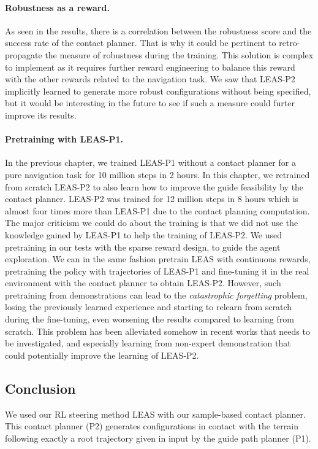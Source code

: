 \paragraph{Robustness as a reward.} 
As seen in the results, there is a correlation between the robustness score and the success rate of the contact planner. 
That is why it could be pertinent to retro-propagate the measure of robustness during the training.
This solution is complex to implement as it requires further reward engineering to balance this reward with the other rewards related to the navigation task. 
We saw that LEAS-P2 implicitly learned to generate more robust configurations without being specified, but it would be interesting in the future to see if such a measure could furter improve its results.

\paragraph{Pretraining with LEAS-P1.} 
In the previous chapter, we trained LEAS-P1 without a contact planner for a pure navigation task for 10 million steps in 2 hours. 
In this chapter, we retrained from scratch LEAS-P2 to also learn how to improve the guide feasibility by the contact planner. LEAS-P2 was trained for 12 million steps in 8 hours which is almost four times more than LEAS-P1 due to the contact planning computation. 
The major criticism we could do about the training is that we did not use the knowledge gained by LEAS-P1 to help the training of LEAS-P2.
We used pretraining in our tests with the sparse reward design, to guide the agent exploration.
We can in the same fashion pretrain LEAS with continuous rewards, pretraining the policy with trajectories of LEAS-P1 and fine-tuning it in the real environment with the contact planner to obtain LEAS-P2.
However, such pretraining from demonstrations can lead to the \textit{catastrophic forgetting} problem, losing the previously learned experience and starting to relearn from scratch during the fine-tuning, even worsening the results compared to learning from scratch.
This problem has been alleviated somehow in recent works \cite{DDPGfd,pretraining_BC} that needs to be investigated, and especially learning from non-expert demonstration \cite{learning_from_non_expert, meta_learning_from_demo} that could potentially improve the learning of LEAS-P2.

\subsection{Conclusion}
We used our RL steering method LEAS with our sample-based contact planner.
This contact planner (P2) generates configurations in contact with the terrain following exactly a root trajectory given in input by the guide path planner (P1).

